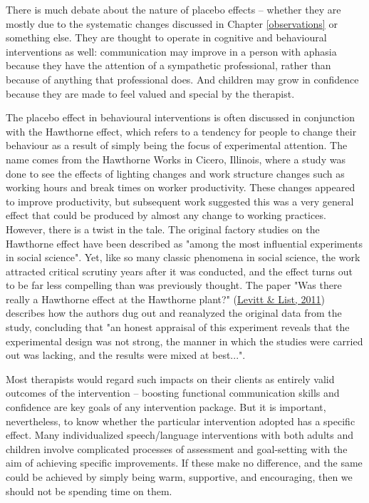 \documentclass{krantz}
\begin{document}
There is much debate about the nature of placebo effects -- whether they are mostly due to the systematic changes discussed in Chapter \ref{observations} or something else. They are thought to operate in cognitive and behavioural interventions as well: communication may improve in a person with aphasia because they have the attention of a sympathetic professional, rather than because of anything that professional does. And children may grow in confidence because they are made to feel valued and special by the therapist.

\begin{tcolorbox}[colback=Black!5!lightgray,colframe=black!75!black,coltitle=white,title=The Hawthorne Effect]\label{box:Hawthorne}
The placebo effect in behavioural interventions is often discussed in conjunction with the Hawthorne effect, which refers to a tendency for people to change their behaviour as a result of simply being the focus of experimental attention. The name comes from the Hawthorne Works in Cicero, Illinois, where a study was done to see the effects of lighting changes and work structure changes such as working hours and break times on worker productivity. These changes appeared to improve productivity, but subsequent work suggested this was a very general effect that could be produced by almost any change to working practices. However, there is a twist in the tale. The original factory studies on the Hawthorne effect have been described as "among the most influential experiments in social science". Yet, like so many classic phenomena in social science, the work attracted critical scrutiny years after it was conducted, and the effect turns out to be far less compelling than was previously thought. The paper "Was there really a Hawthorne effect at the Hawthorne plant?" (\protect\hyperlink{ref-levitt2011}{Levitt \& List, 2011}) describes how the authors dug out and reanalyzed the original data from the study, concluding that "an honest appraisal of this experiment reveals that the experimental design was not strong, the manner in which the studies were carried out was lacking, and the results were mixed at best...".
\end{tcolorbox}

Most therapists would regard such impacts on their clients as entirely valid outcomes of the intervention -- boosting functional communication skills and confidence are key goals of any intervention package. But it is important, nevertheless, to know whether the particular intervention adopted has a specific effect. Many individualized speech/language interventions with both adults and children involve complicated processes of assessment and goal-setting with the aim of achieving specific improvements. If these make no difference, and the same could be achieved by simply being warm, supportive, and encouraging, then we should not be spending time on them.
\end{document}
